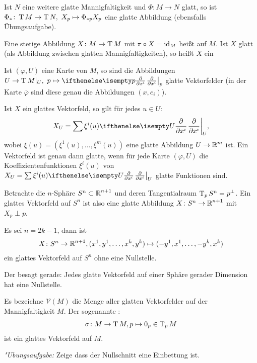 Ist $N$ eine weitere glatte Mannigfaltigkeit und $\Phi \colon M \to N$ glatt, so ist $\Phi_{*} \colon \operatorname{T} M \to \operatorname{T} N, \ X_p \mapsto \Phi_{*p}X_p$ eine glatte Abbildung (ebensfalls Übungsaufgabe).

\begin{Dfn}
  Eine stetige Abbildung $X \colon M \to \operatorname{T} M$ mit $\pi \circ X = \operatorname{id}_M$ heißt  auf $M$.
  Ist $X$ glatt (als Abbildung zwischen glatten Mannigfaltigkeiten), so heißt $X$ ein 
\end{Dfn}

\begin{bem}
Ist $(\varphi, U)$ eine Karte von $M$, so sind die Abbildungen $U \to \T M|_U, \ p \mapsto \pdifffrac[p]{}{x^{i}}$ glatte Vektorfelder (in der Karte $\overline \varphi$ sind diese genau die Abbildungen $(x,e_i)$).

Ist $X$ ein glattes Vektorfeld, so gilt für jedes $u \in U$:
\begin{align*}
	X_U = \sum \xi^i(u) \pdifffrac[U]{}{x^i},
\end{align*}
wobei $\xi(u) = (\xi^1(u), \ldots, \xi^m(u))$ eine glatte Abbildung $U \to \operatorname{\mathbb{R}}^m$ ist. Ein Vektorfeld ist genau dann glatte, wenn für jede Karte $(\varphi, U)$ die Koeffizientenfunktionen $\xi^i(u)$ von $X_U = \sum \xi^i(u) \pdifffrac[U]{}{x^i}$ glatte Funktionen sind.
\end{bem}



\begin{bsp}
  Betrachte die $n$-Sphäre $S^n \subset \operatorname{\mathbb{R}}^{n+1}$ und deren Tangentialraum $\operatorname{T}_pS^n = p^{\perp}$.
  Ein glattes Vektorfeld auf $S^n$ ist also eine glatte Abbildung $X \colon S^n \to \operatorname{\mathbb{R}}^{n+1}$ mit $X_p \perp p$.
  
  Es sei $n=2k-1$, dann ist
  \begin{align*}
    X \colon S^n \to \operatorname{\mathbb{R}}^{n+1}, (x^1,y^1, \ldots, x^k,y^k) \mapsto (-y^1,x^1, \ldots, -y^k,x^k)
  \end{align*}
  ein glattes Vektorfeld auf $S^n$ ohne eine Nullstelle.
\end{bsp}

\begin{bem}
  Der  besagt gerade: Jedes glatte Vektorfeld auf einer Sphäre gerader Dimension hat eine Nullstelle.
\end{bem}

\begin{bem}
  Es bezeichne $\mathcal V(M)$ die Menge aller glatten Vektorfelder auf der Mannigfaltigkeit $M$. Der sogenannte :
  \begin{align*}
    \sigma \colon M \to \operatorname{T} M, p \mapsto 0_p \in \operatorname{T}_pM
  \end{align*}
  ist ein glattes Vektorfeld auf $M$.
  
  \emph{"Ubungsaufgabe:} Zeige dass der Nullschnitt eine Einbettung ist.
\end{bem}

